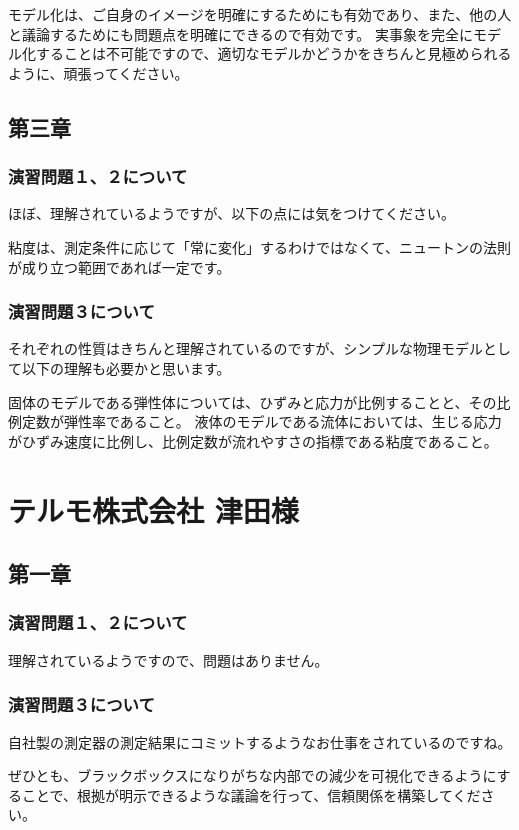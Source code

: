 \documentclass[uplatex,dvipdfmx,a4paper,11pt]{jsreport}
\begin{document}
モデル化は、ご自身のイメージを明確にするためにも有効であり、また、他の人と議論するためにも問題点を明確にできるので有効です。
実事象を完全にモデル化することは不可能ですので、適切なモデルかどうかをきちんと見極められるように、頑張ってください。

\subsection*{第三章}
\subsubsection*{演習問題１、２について}
ほぼ、理解されているようですが、以下の点には気をつけてください。

粘度は、測定条件に応じて「常に変化」するわけではなくて、ニュートンの法則が成り立つ範囲であれば一定です。

\subsubsection*{演習問題３について}
それぞれの性質はきちんと理解されているのですが、シンプルな物理モデルとして以下の理解も必要かと思います。

固体のモデルである弾性体については、ひずみと応力が比例することと、その比例定数が弾性率であること。
液体のモデルである流体においては、生じる応力がひずみ速度に比例し、比例定数が流れやすさの指標である粘度であること。

\clearpage

\section*{テルモ株式会社 津田様}
\subsection*{第一章}
\subsubsection*{演習問題１、２について}
理解されているようですので、問題はありません。

\subsubsection*{演習問題３について}

自社製の測定器の測定結果にコミットするようなお仕事をされているのですね。

ぜひとも、ブラックボックスになりがちな内部での減少を可視化できるようにすることで、根拠が明示できるような議論を行って、信頼関係を構築してください。
\end{document}
